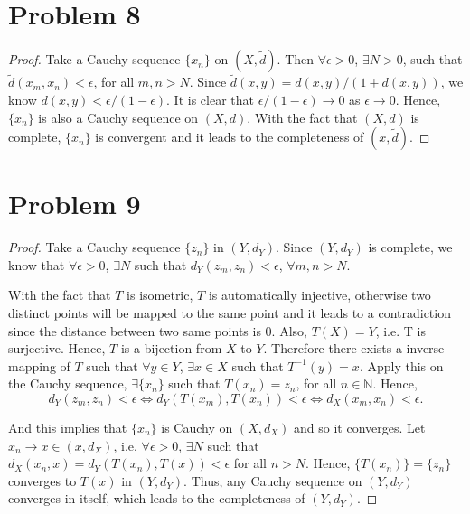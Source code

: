 \documentclass[12pt]{article}
\begin{document}
\section*{Problem 8}

\begin{proof}

Take a Cauchy sequence $\{x_n\}$ on $(X, \tilde{d})$. Then $\forall \epsilon > 0$, $\exists N > 0$, such that $\tilde d(x_m, x_n) < \epsilon $, for all $m, n > N$. Since $\tilde d(x, y) = d(x, y)/(1+d(x, y))$, we know $d(x, y) < \epsilon / (1-\epsilon)$. It is clear that $\epsilon / (1-\epsilon) \rightarrow 0$ as $\epsilon \rightarrow 0$. Hence, $\{x_n\}$ is also a Cauchy sequence on $(X, d)$. With the fact that $(X, d)$ is complete, $\{x_n\}$ is convergent and it leads to the completeness of $(x, \tilde{d})$.


\end{proof}

\section*{Problem 9}

\begin{proof}

Take a Cauchy sequence $\{z_n\}$ in $(Y, d_Y)$. Since $(Y, d_Y)$ is complete, we know that $\forall \epsilon > 0$, $\exists N$ such that $d_Y(z_m, z_n) < \epsilon$, $\forall m,n > N$. 

With the fact that $T$ is isometric, $T$ is automatically injective, otherwise two distinct points will be mapped to the same point and it leads to a contradiction since the distance between two same points is $0$. Also, $T(X) = Y$, i.e. T is surjective. Hence, $T$ is a bijection from $X$ to $Y$. Therefore there exists a inverse mapping of $T$ such that $\forall y\in Y$, $\exists x\in X$ such that $T^{-1}(y) = x$. Apply this on the Cauchy sequence,  $\exists \{x_n\}$ such that $T(x_n) = z_n$, for all $n\in\mathbb{N}$. Hence, 
$$
d_Y(z_m, z_n)<\epsilon \Leftrightarrow d_Y(T(x_m), T(x_n))<\epsilon \Leftrightarrow d_X(x_m, x_n)< \epsilon.
$$

And this implies that $\{x_n\}$ is Cauchy on $(X, d_X)$ and so it converges. Let $x_n \rightarrow x\in(x, d_X)$, i.e, $\forall \epsilon > 0$, $\exists N$ such that $d_X(x_n, x) = d_Y(T(x_n), T(x))< \epsilon$ for all $n > N$. Hence, $\{T(x_n)\} = \{z_n\}$ converges to $T(x)$ in $(Y, d_Y)$. Thus, any Cauchy sequence on $(Y, d_Y)$ converges in itself, which leads to the completeness of $(Y, d_Y)$.

\end{proof}
\end{document}
